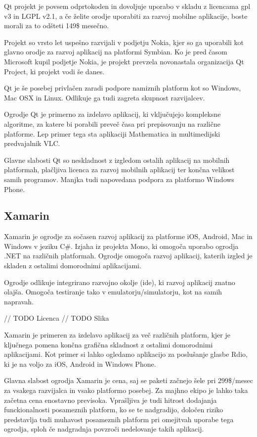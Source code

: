 Qt projekt je povsem odprtokoden in dovoljuje uporabo v skladu z licencama \gls{gpl} v3\cite{gpl} in LGPL v2.1\cite{lgpl}, a če želite orodje uporabiti za razvoj mobilne aplikacije, boste morali za to odšteti 149\$ mesečno.

Projekt so vrsto let uspešno razvijali v podjetju Nokia, kjer so ga uporabili kot glavno orodje za razvoj aplikacij na platformi Symbian. Ko je pred časom Microsoft kupil podjetje Nokia, je projekt prevzela novonastala organizacija Qt Project, ki projekt vodi še danes.

Qt je še posebej privlačen zaradi podpore namiznih platform kot so Windows, Mac OSX in Linux. Odlikuje ga tudi zagreta skupnost razvijalcev.

Ogrodje Qt je primerno za izdelavo aplikacij, ki vključujejo kompleksne algoritme, za katere bi porabili preveč časa pri prepisovanju na različne platforme. Lep primer tega sta aplikaciji Mathematica\cite{mathematica} in multimedijski predvajalnik VLC\cite{vlc}.

Glavne slabosti Qt so neskladnost z izgledom ostalih aplikacij na mobilnih platformah, plačljiva licenca za razvoj mobilnih aplikacij ter končna velikost samih programov. Manjka tudi napovedana podpora za platformo Windows Phone.

\subsection{Xamarin}

Xamarin\cite{xamarin} je ogrodje za sočasen razvoj aplikacij za platforme iOS, Android, Mac in Windows v jeziku C\#. Izjaha iz projekta Mono\cite{mono}, ki omogoča uporabo ogrodja .NET\cite{dotnet} na različnih platformah. Ogrodje omogoča razvoj aplikacij, katerih izgled je skladen z ostalimi domorodnimi aplikacijami.

Ogrodje odlikuje integrirano razvojno okolje (\gls{ide}), ki razvoj aplikacij znatno olajša. Omogoča testiranje tako v emulatorju/simulatorju, kot na samih napravah.

// TODO Licenca
// TODO Slika

Xamarin je primeren za izdelavo aplikacij za več različnih platform, kjer je ključnega pomena končna grafična skladnost z ostalimi domorodnimi aplikacijami. Kot primer si lahko ogledamo aplikacijo za poslušanje glasbe Rdio\cite{rdio}, ki je na voljo za iOS, Android in Windows Phone.

Glavna slabost ogrodja Xamarin je cena, saj se paketi začnejo šele pri 299\$/mesec za vsakega razvijalca in vsako platformo posebej. Za majhno ekipo je lahko taka začetna cena enostavno previsoka. Vprašljiva je tudi hitrost dodajanja funckionalnosti posameznih platform, ko se te nadgradijo, določen riziko predstavlja tudi muhavost posameznih platform pri omejitvah uporabe tega ogrodja, sploh če nadgradnja povzroči nedelovanje takih aplikacij.

